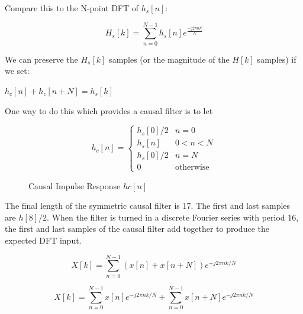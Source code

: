 \documentclass[fleqn]{article}
\begin{document}
\begin{enumerate}
\begin{enumerate}[nolistsep]
			Compare this to the N-point DFT of $h_s[n]$:
			
			\begin{equation*}
				H_s[k] = \sum_{n=0}^{N-1}{h_s[n]e^{\frac{-j2{\pi}nk}{N}}}
			\end{equation*}
			
			We can preserve the $H_s[k]$ samples (or the magnitude of the $H[k]$ samples) if we set:
			
			$h_c[n] + h_c[n+N] = h_s[k]$
			
			One way to do this which provides a causal filter is to let
			
			\begin{equation*}
				h_c[n] = \begin{cases}
					h_s[0]/2 & n = 0\\
					h_s[n]   & 0 < n < N\\
					h_s[0]/2 & n = N\\
					0		 & \text{otherwise}
				\end{cases}
			\end{equation*}
			
			\begin{figure}[H]
				\centerline{}
				\caption{Causal Impulse Response $hc[n]$}
			\end{figure}
			
			The final length of the symmetric causal filter is 17. The first and last samples are $h[8]/2$. When the filter is turned in a discrete Fourier series with period 16, the first and last samples of the causal filter add together to produce the expected DFT input.
			
			\begin{equation*}
				X[k] = \sum_{n=0}^{N-1}{(x[n] + x[n + N])e^{-j2{\pi}nk/N}}
			\end{equation*}
			
			\begin{equation*}
				X[k] = \sum_{n=0}^{N-1}{x[n]e^{-j2{\pi}nk/N}} + \sum_{n=0}^{N-1}{x[n + N]e^{-j2{\pi}nk/N}}
			\end{equation*}
			

\end{enumerate}
\end{enumerate}
\end{document}
